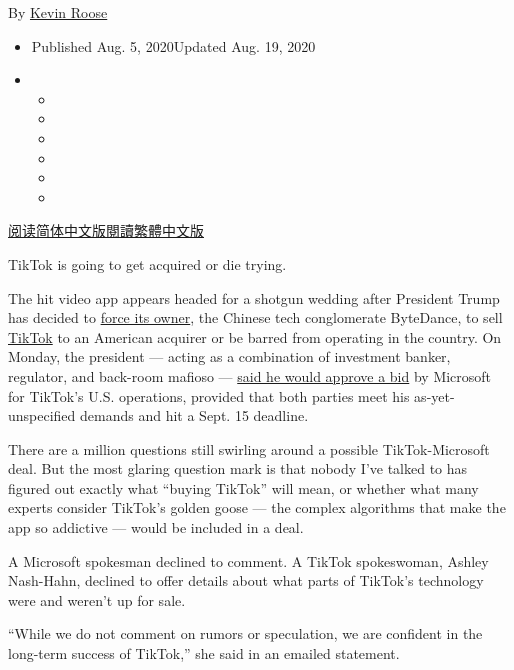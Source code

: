 By \href{https://www.nytimes3xbfgragh.onion/by/kevin-roose}{Kevin Roose}

\begin{itemize}
\item
  Published Aug. 5, 2020Updated Aug. 19, 2020
\item
  \begin{itemize}
  \item
  \item
  \item
  \item
  \item
  \item
  \end{itemize}
\end{itemize}

\href{https://cn.nytimes3xbfgragh.onion/technology/20200805/tiktok-deal-algorithm/}{阅读简体中文版}\href{https://cn.nytimes3xbfgragh.onion/technology/20200805/tiktok-deal-algorithm/zh-hant/}{閱讀繁體中文版}

TikTok is going to get acquired or die trying.

The hit video app appears headed for a shotgun wedding after President
Trump has decided to
\href{https://www.nytimes3xbfgragh.onion/2020/08/03/technology/tiktok-bytedance-us-china.html}{force
its owner}, the Chinese tech conglomerate ByteDance, to sell
\href{https://www.nytimes3xbfgragh.onion/2020/08/19/technology/trump-oracle-tiktok.html}{TikTok}
to an American acquirer or be barred from operating in the country. On
Monday, the president --- acting as a combination of investment banker,
regulator, and back-room mafioso ---
\href{https://www.nytimes3xbfgragh.onion/2020/08/03/technology/trump-tiktok-microsoft.html}{said
he would approve a bid} by Microsoft for TikTok's U.S. operations,
provided that both parties meet his as-yet-unspecified demands and hit a
Sept. 15 deadline.

There are a million questions still swirling around a possible
TikTok-Microsoft deal. But the most glaring question mark is that nobody
I've talked to has figured out exactly what ``buying TikTok'' will mean,
or whether what many experts consider TikTok's golden goose --- the
complex algorithms that make the app so addictive --- would be included
in a deal.

A Microsoft spokesman declined to comment. A TikTok spokeswoman, Ashley
Nash-Hahn, declined to offer details about what parts of TikTok's
technology were and weren't up for sale.

``While we do not comment on rumors or speculation, we are confident in
the long-term success of TikTok,'' she said in an emailed statement.

